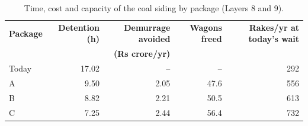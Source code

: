\begin{table}[!htbp]
\centering
\caption[Time, cost and capacity of the coal siding by package]{Time, cost and capacity of the coal siding by package (Layers 8 and 9).}
\label{tab:summary}
\small
\begin{tabular}{@{}lrrrr@{}}
\toprule
\textbf{Package} & \textbf{Detention (h)} & \textbf{Demurrage avoided} & \textbf{Wagons freed} & \textbf{Rakes/yr at today's wait} \\
 & & \textbf{(Rs crore/yr)} & & \\
\midrule
Today & 17.02 & -- & -- & 292 \\
A & 9.50 & 2.05 & 47.6 & 556 \\
B & 8.82 & 2.21 & 50.5 & 613 \\
C & 7.25 & 2.44 & 56.4 & 732 \\
\bottomrule
\end{tabular}
\end{table}
